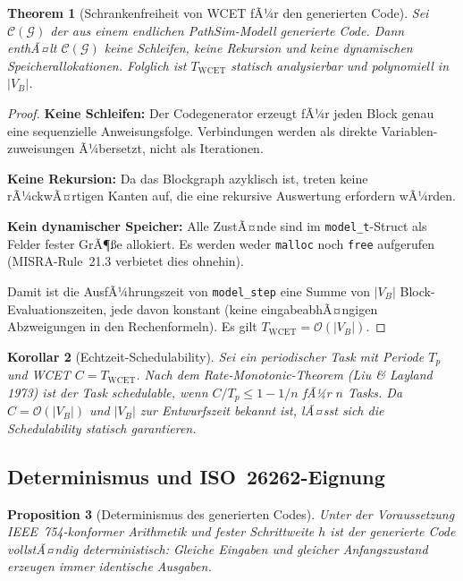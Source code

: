 ﻿\documentclass[12pt,a4paper]{article}
\newtheorem{theorem}{Theorem}[section]
\newtheorem{korollar}[theorem]{Korollar}
\newtheorem{proposition}[theorem]{Proposition}
\theoremstyle{definition}
\begin{document}
\begin{theorem}[Schrankenfreiheit von WCET fÃ¼r den generierten Code]
\label{thm:wcet}
Sei $\mathcal{C}(\mathcal{G})$ der aus einem endlichen PathSim-Modell generierte
Code. Dann enthÃ¤lt $\mathcal{C}(\mathcal{G})$ keine Schleifen, keine
Rekursion und keine dynamischen Speicherallokationen. Folglich ist
$T_{\mathrm{WCET}}$ statisch analysierbar und polynomiell in $|V_B|$.
\end{theorem}

\begin{proof}
\textbf{Keine Schleifen:} Der Codegenerator erzeugt fÃ¼r jeden Block genau
eine sequenzielle Anweisungsfolge. Verbindungen werden als direkte Variablen-
zuweisungen Ã¼bersetzt, nicht als Iterationen.

\textbf{Keine Rekursion:} Da das Blockgraph azyklisch ist, treten keine
rÃ¼ckwÃ¤rtigen Kanten auf, die eine rekursive Auswertung erfordern wÃ¼rden.

\textbf{Kein dynamischer Speicher:} Alle ZustÃ¤nde sind im \texttt{model\_t}-Struct
als Felder fester GrÃ¶\ss{}e allokiert. Es werden weder \texttt{malloc} noch
\texttt{free} aufgerufen (MISRA-Rule~21.3 verbietet dies ohnehin).

Damit ist die AusfÃ¼hrungszeit von \texttt{model\_step} eine Summe von
$|V_B|$ Block-Evaluations\-zeiten, jede davon konstant (keine
eingabeabhÃ¤ngigen Abzweigungen in den Rechenformeln). Es gilt
$T_{\mathrm{WCET}} = \mathcal{O}(|V_B|)$.
\end{proof}

\begin{korollar}[Echtzeit-Schedulability]
Sei ein periodischer Task mit Periode $T_p$ und WCET $C = T_{\mathrm{WCET}}$.
Nach dem Rate-Monotonic-Theorem (Liu \& Layland 1973) ist der Task schedulable,
wenn $C / T_p \leq 1 - 1/n$ fÃ¼r $n$ Tasks. Da $C = \mathcal{O}(|V_B|)$ und
$|V_B|$ zur Entwurfszeit bekannt ist, lÃ¤sst sich die Schedulability statisch
garantieren.
\end{korollar}

\subsection{Determinismus und ISO~26262-Eignung}

\begin{proposition}[Determinismus des generierten Codes]
\label{prop:det}
Unter der Voraussetzung IEEE~754-konformer Arithmetik und fester Schrittweite $h$
ist der generierte Code \emph{vollstÃ¤ndig deterministisch}: Gleiche Eingaben
und gleicher Anfangszustand erzeugen immer identische Ausgaben.
\end{proposition}
\end{document}
